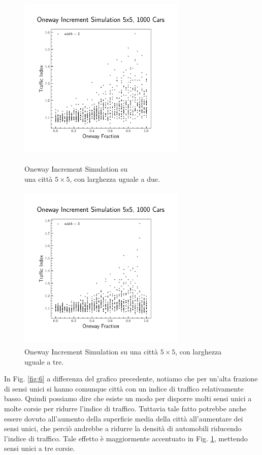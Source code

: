 \documentclass{article}
\begin{document}
        \begin{figure}[H]
            \begin{minipage}{.5\textwidth}
                \centering
                \includegraphics[width=8cm, height=8cm]{oneway_increment_2.png}  
                \caption{Oneway Increment Simulation su\\ una città $5 \times 5$, con larghezza uguale a due.}
                \label{fig:6}
            \end{minipage}
            \begin{minipage}{.5\textwidth}
                \centering
                \includegraphics[width=8cm, height=8cm]{oneway_increment_3.png}  
                \caption{Oneway Increment Simulation su una città $5 \times 5$, con larghezza uguale a tre.}
                \label{fig:7}
            \end{minipage}
        \end{figure}

        In Fig. \ref{fig:6} a differenza del grafico precedente, notiamo che per un'alta frazione di sensi unici si hanno comunque città
        con un indice di traffico relativamente basso. Quindi possiamo dire che esiste un modo per disporre molti sensi unici a molte corsie per
        ridurre l'indice di traffico. Tuttavia tale fatto potrebbe anche essere dovuto all'aumento della superficie media della città all'aumentare dei 
        sensi unici, che perciò andrebbe a ridurre la densità di automobili riducendo l'indice di traffico.
        Tale effetto è maggiormente accentuato in Fig. \ref{fig:7}, mettendo sensi unici a tre corsie.\\
        \hfill\\
\end{document}
